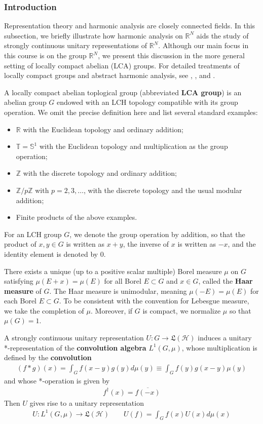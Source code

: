 \documentclass[12pt,b5paper,notitlepage]{article}
\theoremstyle{definition}
\theoremstyle{plain}
\newcommand{\fk}{\mathfrak}
\newcommand{\ovl}{\overline}
\newcommand{\Zbb}{\mathbb Z}
\newcommand{\Rbb}{\mathbb R}
\newcommand{\Tbb}{\mathbb T}
\newcommand{\Sbb}{{\mathbb S}}
\newcommand{\MH}{\mathcal H}
\numberwithin{equation}{section}
\begin{document}
\subsubsection{Introduction}\label{lb523}



Representation theory and harmonic analysis are closely connected fields. In this subsection, we briefly illustrate how harmonic analysis on $\Rbb^N$ aids the study of strongly continuous unitary representations of $\Rbb^N$. Although our main focus in this course is on the group $\Rbb^N$, we present this discussion in the more general setting of locally compact abelian (LCA) groups. For detailed treatments of locally compact groups and abstract harmonic analysis, see \cite{DE-P}, \cite{Fol-A}, and \cite[Ch. 6]{Sim-O}.

A locally compact abelian toplogical group (abbreviated \textbf{LCA group})  is an abelian group $G$ endowed with an LCH topology compatible with its group operation. We omit the precise definition here and list several standard examples:
\begin{itemize}
\item $\Rbb$ with the Euclidean topology and ordinary addition;
\item $\Tbb=\Sbb^1$ with the Euclidean topology and multiplication as the group operation;
\item $\Zbb$ with the discrete topology and ordinary addition;
\item $\Zbb/p\Zbb$ with $p=2,3,\dots$, with the discrete topology and the usual modular addition;
\item Finite products of the above examples.
\end{itemize}
For an LCH group $G$, we denote the group operation by addition, so that the product of $x,y\in G$ is written as $x+y$, the inverse of $x$ is written as $-x$, and the identity element is denoted by $0$.

There exists a unique (up to a positive scalar multiple) Borel measure $\mu$ on $G$ satisfying $\mu(E+x)=\mu(E)$ for all Borel $E\subset G$ and $x\in G$, called the \textbf{Haar measure} of $G$. The Haar measure is unimodular, meaning $\mu(-E)=\mu(E)$ for each Borel $E\subset G$. To be consistent with the convention for Lebesgue measure, we take the completion of $\mu$. Moreover, if $G$ is compact, we normalize $\mu$ so that $\mu(G)=1$. 

A strongly continuous unitary representation $U:G\rightarrow\fk L(\MH)$ induces a unitary *-representation of the \textbf{convolution algebra} $L^1(G,\mu)$, whose multiplication is defined by the \textbf{convolution}
\begin{align*}
(f*g)(x)=\int_G f(x-y)g(y)d\mu(y)\equiv \int_G f(y)g(x-y)\mu(y)
\end{align*}
and whose *-operation is given by
\begin{align*}
f^\dagger(x)=\ovl{f(-x)}
\end{align*}
Then $U$ gives rise to a unitary representation
\begin{align*}
U:L^1(G,\mu)\rightarrow\fk L(\MH)\qquad U(f)=\int_G f(x)U(x)d\mu(x)
\end{align*}
\end{document}
